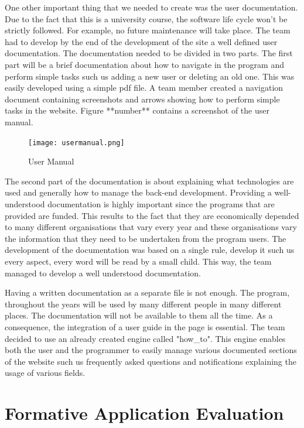 \documentclass{l3proj}
\begin{document}
One other important thing that we needed to create was the user documentation. Due to the fact that this is a university course, the software life cycle won't be strictly followed. For example, no future maintenance will take place. The team had to develop by the end of the development of the site a well defined user documentation. The documentation needed to be divided in two parts. The first part will be a brief documentation about how to navigate in the program and perform simple tasks such us adding a new user or deleting an old one. This was easily developed using a simple pdf file. A team member created a navigation document containing screenshots and arrows showing how to perform simple tasks in the website. Figure **number** contains a screenshot of the user manual.

\begin{figure}
  \centerline{\texttt{[image: usermanual.png]}}
  \caption{User Manual }
\end{figure}

 The second part of the documentation is about explaining what technologies are used and generally how to manage the back-end development. Providing a well-understood documentation is highly important since the programs that are provided are funded. This results to the fact that they are economically depended to many different organisations that vary every year and these organisations vary the information that they need to be undertaken from the program users. The development of the documentation was based on a single rule, develop it such us every aspect, every word will be read by a small child. This way, the team managed to develop a well understood documentation. 

Having a written documentation as a separate file is not enough. The program, throughout the years will be used by many different people in many different places. The documentation will not be available to them all the time. As a consequence, the integration of a user guide in the page is essential. The team decided to use an already created engine called "how_to". This engine enables both the user and the programmer to easily manage various documented sections of the website such us frequently asked questions and notifications explaining the usage of various fields.


\section{Formative Application Evaluation}
\label{sec:appEval}
\end{document}

